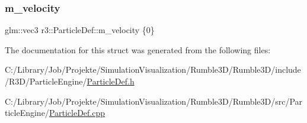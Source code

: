 \mbox{\label{structr3_1_1_particle_def_a0c69fb8b0e2994e5ff24aa1156bdb5fd}} 
\subsubsection{\texorpdfstring{m\+\_\+velocity}{m\_velocity}}
{\footnotesize\ttfamily glm\+::vec3 r3\+::\+Particle\+Def\+::m\+\_\+velocity \{0\}}



The documentation for this struct was generated from the following files\+:\begin{DoxyCompactItemize}
\item 
C\+:/\+Library/\+Job/\+Projekte/\+Simulation\+Visualization/\+Rumble3\+D/\+Rumble3\+D/include/\+R3\+D/\+Particle\+Engine/\mbox{\hyperlink{_particle_def_8h}{Particle\+Def.\+h}}\item 
C\+:/\+Library/\+Job/\+Projekte/\+Simulation\+Visualization/\+Rumble3\+D/\+Rumble3\+D/src/\+Particle\+Engine/\mbox{\hyperlink{_particle_def_8cpp}{Particle\+Def.\+cpp}}\end{DoxyCompactItemize}
